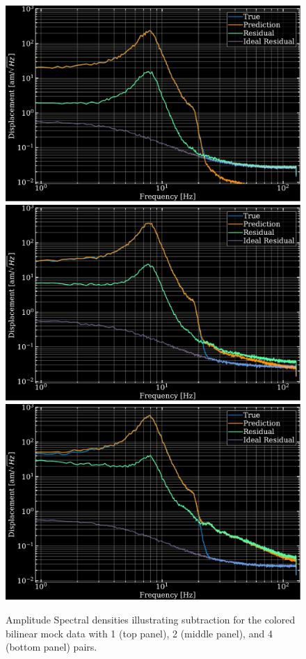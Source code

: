 \begin{refsection}
\begin{figure}[htbp]
   \centering
   \includegraphics[width=.7\columnwidth]{chapter_noise_sub/etc/spectra1C}
    \includegraphics[width=.7\columnwidth]{chapter_noise_sub/etc/spectra2C}
     \includegraphics[width=.7\columnwidth]{chapter_noise_sub/etc/spectra4C}
   \caption{Amplitude Spectral densities illustrating subtraction for the colored bilinear mock data with 1 (top panel), 2 (middle panel), and 4 (bottom panel) pairs.} 
   \label{fig:ASD1}
\end{figure}


\end{refsection}
